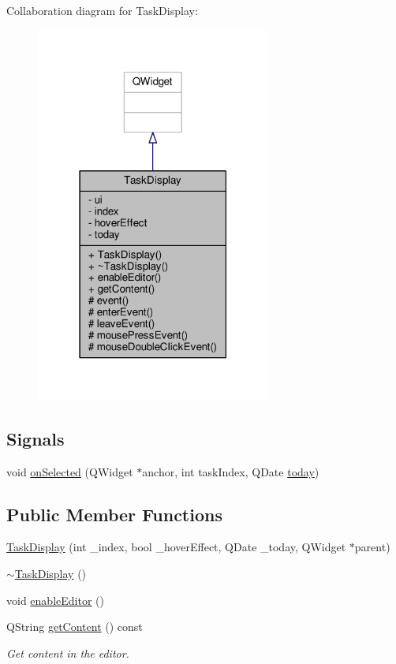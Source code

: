 Collaboration diagram for Task\+Display\+:
\nopagebreak
\begin{figure}[H]
\begin{center}
\leavevmode
\includegraphics[width=219pt]{classTaskDisplay__coll__graph}
\end{center}
\end{figure}
\subsection*{Signals}
\begin{DoxyCompactItemize}
\item 
void \hyperlink{classTaskDisplay_a25d79a4505fb588372786e1798c826a7}{on\+Selected} (Q\+Widget $\ast$anchor, int task\+Index, Q\+Date \hyperlink{classTaskDisplay_a1adb50384f7db484b7f35c8952395157}{today})
\end{DoxyCompactItemize}
\subsection*{Public Member Functions}
\begin{DoxyCompactItemize}
\item 
\hyperlink{classTaskDisplay_acbfb32482b03fc1c64bf8658403f2af9}{Task\+Display} (int \+\_\+index, bool \+\_\+hover\+Effect, Q\+Date \+\_\+today, Q\+Widget $\ast$parent)
\item 
\hyperlink{classTaskDisplay_a5ce3c02b7a2d887b0842d5ae141a212e}{$\sim$\+Task\+Display} ()
\item 
void \hyperlink{classTaskDisplay_ae31dc04c0368ab8202067aec2751e2db}{enable\+Editor} ()
\item 
Q\+String \hyperlink{classTaskDisplay_a4d808c7da0c5c7c95d049a013b988fec}{get\+Content} () const 
\begin{DoxyCompactList}\small\item\em Get content in the editor. \end{DoxyCompactList}\end{DoxyCompactItemize}

